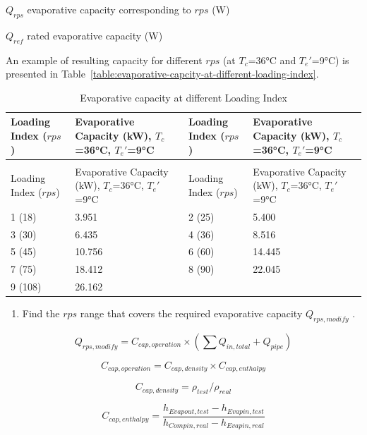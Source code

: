 $Q_{rps}$	evaporative capacity corresponding to $rps$ (W) 

$Q_{ref}$	rated evaporative capacity (W) 

An example of resulting capacity for different $rps$ (at $T_c$=36°C and ${T_e}'$=9°C) is presented in Table~\ref{table:evaporative-capcity-at-different-loading-index}.

\begin{longtable}[c]{>{\raggedright}p{1.5in}>{\raggedright}p{1.5in}>{\raggedright}p{1.5in}>{\raggedright}p{1.5in}}
\caption{Evaporative capacity at different Loading Index \label{table:evaporative-capacity-at-different-loading-index}} \tabularnewline
\toprule 
Loading Index ($rps$) & Evaporative Capacity (kW), $T_c$=36°C, ${T_e}'$=9°C & Loading Index ($rps$) & Evaporative Capacity (kW), $T_c$=36°C, ${T_e}'$=9°C \tabularnewline
\midrule
\endfirsthead

\caption[]{Evaporative capacity at different Loading Index} \tabularnewline
\toprule 
Loading Index ($rps$) & Evaporative Capacity (kW), $T_c$=36°C, ${T_e}'$=9°C & Loading Index ($rps$) & Evaporative Capacity (kW), $T_c$=36°C, ${T_e}'$=9°C \tabularnewline
\midrule
\endhead

1 (18)  & 3.951  & 2 (25) & 5.400  \tabularnewline
3 (30)  & 6.435  & 4 (36) & 8.516  \tabularnewline
5 (45)  & 10.756 & 6 (60) & 14.445 \tabularnewline
7 (75)  & 18.412 & 8 (90) & 22.045 \tabularnewline
9 (108) & 26.162 &        &        \tabularnewline
\bottomrule
\end{longtable}

\begin{enumerate}
\def\labelenumi{\alph{enumi}.}
\setcounter{enumi}{1}
\tightlist
\item
  Find the \(rps\) range that covers the required evaporative capacity \(Q_{rps,modify}\) .
\end{enumerate}

\begin{equation}
Q_{rps,modify} = C_{cap,operation}\times(\sum{Q_{in,total}}+Q_{pipe})
\end{equation}

\begin{equation}
C_{cap,operation} = C_{cap,density}\times{C_{cap,enthalpy}}
\end{equation}

\begin{equation}
C_{cap,density} = \rho_{test}/\rho_{real}
\end{equation}

\begin{equation}
C_{cap,enthalpy} = \frac{h_{Evapout,test}-h_{Evapin,test}}{h_{Compin,real}-h_{Evapin,real}}
\end{equation}

